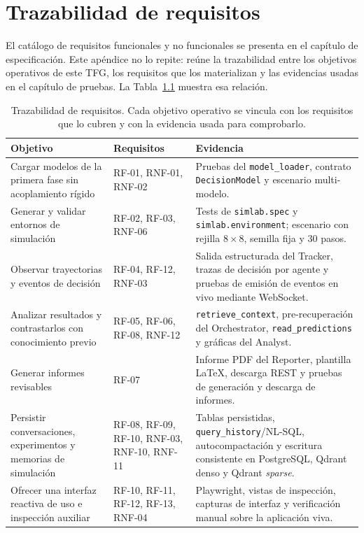 \chapter{Trazabilidad de requisitos}
\label{ap:requisitos}
\label{ap:trazabilidad-requisitos}

El catálogo de requisitos funcionales y no funcionales se presenta en el
capítulo de especificación. Este apéndice no lo repite: reúne la trazabilidad
entre los objetivos operativos de este TFG, los requisitos que los
materializan y las evidencias usadas en el capítulo de pruebas. La
Tabla~\ref{tab:trazabilidad-requisitos} muestra esa relación.

\begin{table}[H]
\centering
\scriptsize
\setlength{\tabcolsep}{4pt}
\renewcommand{\arraystretch}{1.04}
\begin{tabular}{|>{\raggedright\arraybackslash}p{3.35cm}|>{\raggedright\arraybackslash}p{2.45cm}|>{\raggedright\arraybackslash}p{5.45cm}|} \hline
\textbf{Objetivo} & \textbf{Requisitos} & \textbf{Evidencia} \\ \hline
Cargar modelos de la primera fase sin acoplamiento rígido & RF-01, RNF-01, RNF-02 & Pruebas del \texttt{model\_loader}, contrato \texttt{DecisionModel} y escenario multi-modelo. \\ \hline
Generar y validar entornos de simulación & RF-02, RF-03, RNF-06 & Tests de \texttt{simlab.spec} y \texttt{simlab.environment}; escenario con rejilla \(8\times8\), semilla fija y 30 pasos. \\ \hline
Observar trayectorias y eventos de decisión & RF-04, RF-12, RNF-03 & Salida estructurada del Tracker, trazas de decisión por agente y pruebas de emisión de eventos en vivo mediante WebSocket. \\ \hline
Analizar resultados y contrastarlos con conocimiento previo & RF-05, RF-06, RF-08, RNF-12 & \texttt{retrieve\_context}, pre-recuperación del Orchestrator, \texttt{read\_predictions} y gráficas del Analyst. \\ \hline
Generar informes revisables & RF-07 & Informe PDF del Reporter, plantilla LaTeX, descarga REST y pruebas de generación y descarga de informes. \\ \hline
Persistir conversaciones, experimentos y memorias de simulación & RF-08, RF-09, RF-10, RNF-03, RNF-10, RNF-11 & Tablas persistidas, \texttt{query\_history}/NL-SQL, autocompactación y escritura consistente en PostgreSQL, Qdrant denso y Qdrant \textit{sparse}. \\ \hline
Ofrecer una interfaz reactiva de uso e inspección auxiliar & RF-10, RF-11, RF-12, RF-13, RNF-04 & Playwright, vistas de inspección, capturas de interfaz y verificación manual sobre la aplicación viva. \\ \hline
\end{tabular}
\caption[Trazabilidad de requisitos]{Trazabilidad de requisitos. Cada objetivo
operativo se vincula con los requisitos que lo cubren y con la evidencia usada
para comprobarlo.}
\label{tab:trazabilidad-requisitos}
\end{table}

